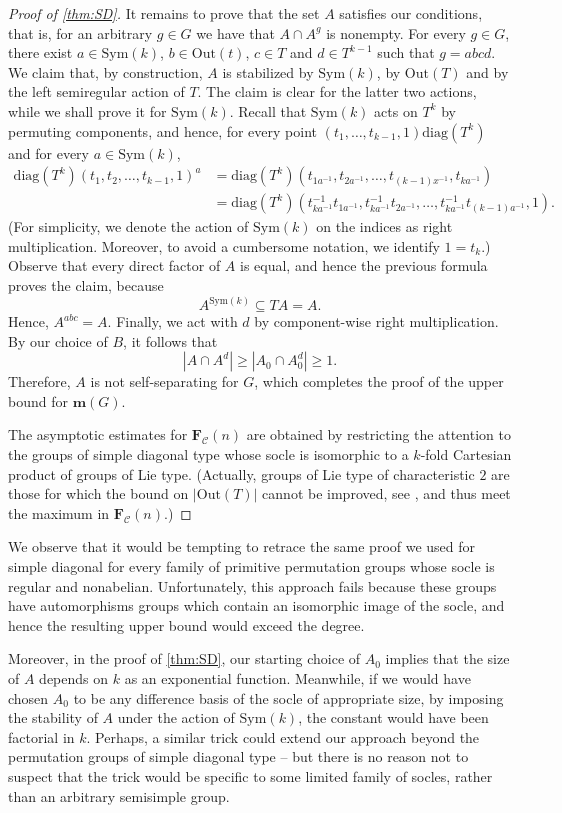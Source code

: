\documentclass[a4paper]{amsart}
\newcommand{\Sym}{\mathrm{Sym}}
\newcommand{\Out}{\mathrm{Out}}
\newcommand{\F}{\mathbf{F}}
\newcommand{\m}{\mathbf{m}}
\newcommand{\C}{\mathcal{C}}
\theoremstyle{definition}
\begin{document}
\begin{proof}[Proof of \cref{thm:SD}]
    It remains to prove that the set $A$ satisfies our conditions, that is, for an arbitrary $g \in G$ we have that $A \cap A^g$ is nonempty. For every $g\in G$, there exist $a \in \Sym(k)$, $b\in \Out(t)$, $c\in T$ and $d \in T^{k-1}$ such that $g = abcd$. We claim that, by construction, $A$ is stabilized by $\Sym(k)$, by $\Out(T)$ and by the left semiregular action of $T$. The claim is clear for the latter two actions, while we shall prove it for $\Sym(k)$. Recall that $\Sym(k)$ acts on $T^k$ by permuting components, and hence, for every point $(t_1, \ldots, t_{k-1},1)\mathrm{diag}(T^k)$ and for every $a\in \Sym(k)$,
    \begin{align*}
        \mathrm{diag}(T^k) (t_1, t_2, \dots, t_{k-1},1)  ^a
        &= \mathrm{diag}(T^k) (t_{1a^{-1}}, t_{2a^{-1}}, \dots, t_{(k-1)x^{-1}},t_{ka^{-1}})  \\
        &= \mathrm{diag}(T^k) (t_{ka^{-1}}^{-1}t_{1a^{-1}}, t_{ka^{-1}}^{-1}t_{2a^{-1}}, \dots, t_{ka^{-1}}^{-1}t_{(k-1)a^{-1}},1) .
    \end{align*}
    (For simplicity, we denote the action of $\Sym(k)$ on the indices as right multiplication. Moreover, to avoid a cumbersome notation, we identify $1=t_k$.)
     Observe that every direct factor of $A$ is equal, and hence the previous formula proves the claim, because
    \[A ^{\Sym(k)} \subseteq TA = A .\]
    Hence, $A^{abc}=A$. Finally, we act with $d$ by component-wise right multiplication. By our choice of $B$, it follows that
    \[ |A \cap A^d | \ge |A_0 \cap A_0^d | \ge 1 .\]
    Therefore, $A$ is not self-separating for $G$, which completes the proof of the upper bound for $\m(G)$.

    The asymptotic estimates for $\F_\C(n)$ are obtained by restricting the attention to the groups of simple diagonal type whose socle is isomorphic to a $k$-fold Cartesian product of groups of Lie type. (Actually, groups of Lie type of characteristic $2$ are those for which the bound on $|\Out(T)|$ cannot be improved, see \cite{Kohl2003}, and thus meet the maximum in $\F_\C(n)$.)
\end{proof}

We observe that it would be tempting to retrace the same proof we used for simple diagonal for every family of primitive permutation groups whose socle is regular and nonabelian. Unfortunately, this approach fails because these groups have automorphisms groups which contain an isomorphic image of the socle, and hence the resulting upper bound would exceed the degree.

Moreover, in the proof of \cref{thm:SD}, our starting choice of $A_0$ implies that the size of $A$ depends on $k$ as an exponential function. Meanwhile, if we would have chosen $A_0$ to be any difference basis of the socle of appropriate size, by imposing the stability of $A$ under the action of $\Sym(k)$, the constant would have been factorial in $k$. Perhaps, a similar trick could extend our approach beyond the permutation groups of simple diagonal type -- but there is no reason not to suspect that the trick would be specific to some limited family of socles, rather than an arbitrary semisimple group.



\end{document}
